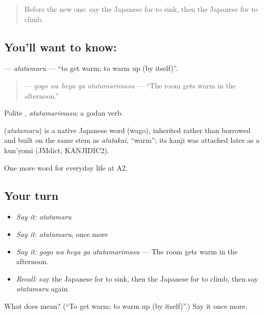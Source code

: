 \label{lesson:JA-C213-atatamaru}



\begin{quote}
Before the new one: say the Japanese for to sink, then the Japanese for to climb.
\end{quote}

\subsection*{You'll want to know: }
\textbf{} — \emph{atatamaru} — \textquotedblleft{}to get warm; to warm up (by itself)\textquotedblright{}.

\begin{quote}
\textbf{  } — \emph{gogo wa heya ga atatamarimasu} — \textquotedblleft{}The room gets warm in the afternoon.\textquotedblright{}
\end{quote}

Polite \textbf{}, \emph{atatamarimasu}; a godan verb.

\begin{cousinweb}
\textbf{} (\emph{atatamaru}) is a native Japanese word (wago), inherited rather than borrowed and built on the same stem as \emph{atatakai}, \textquotedblleft{}warm\textquotedblright{}; its kanji was attached later as a kun'yomi (JMdict, KANJIDIC2).
\end{cousinweb}

\begin{grammarlens}[title={What you've built}]
One more word for everyday life at A2.
\end{grammarlens}

\subsection*{Your turn}
\begin{itemize}
\raggedright
  \item \emph{Say it:} \emph{atatamaru}
  \item \emph{Say it:} \emph{atatamaru}, once more
  \item \emph{Say it:} \emph{gogo wa heya ga atatamarimasu} — The room gets warm in the afternoon.
  \item \emph{Recall:} say the Japanese for to sink, then the Japanese for to climb, then say \emph{atatamaru} again
\end{itemize}

\begin{tcolorbox}[breakable,colback=teal!4,colframe=teal!35!black,title={Before you move on}]
What does  mean? (\textquotedblleft{}To get warm; to warm up (by itself)\textquotedblright{}.) Say it once more.
\end{tcolorbox}
